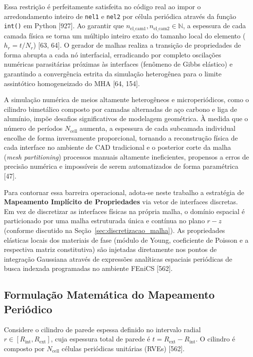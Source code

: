 Essa restrição é perfeitamente satisfeita no código real ao impor o arredondamento inteiro de \texttt{nel1} e \texttt{nel2} por célula periódica através da função \texttt{int()} em Python [927]. Ao garantir que $n_{\text{el\_cam1}}, n_{\text{el\_cam2}} \in \mathbb{N}$, a espessura de cada camada física se torna um múltiplo inteiro exato do tamanho local do elemento ($h_r = t / N_r$) [63, 64]. O gerador de malhas realiza a transição de propriedades de forma abrupta a cada nó interfacial, erradicando por completo oscilações numéricas parasitárias próximas às interfaces (fenômeno de Gibbs elástico) e garantindo a convergência estrita da simulação heterogênea para o limite assintótico homogeneizado do MHA [64, 154].

A simulação numérica de meios altamente heterogêneos e microperiódicos, como o cilindro bimetálico composto por camadas alternadas de aço carbono e liga de alumínio, impõe desafios significativos de modelagem geométrica. À medida que o número de períodos $N_{\text{cell}}$ aumenta, a espessura de cada subcamada individual encolhe de forma inversamente proporcional, tornando a reconstrução física de cada interface no ambiente de CAD tradicional e o posterior corte da malha (\textit{mesh partitioning}) processos manuais altamente ineficientes, propensos a erros de precisão numérica e impossíveis de serem automatizados de forma paramétrica [47].

Para contornar essa barreira operacional, adota-se neste trabalho a estratégia de \textbf{Mapeamento Implícito de Propriedades} via vetor de interfaces discretas. Em vez de discretizar as interfaces físicas na própria malha, o domínio espacial é particionado por uma malha estruturada única e contínua no plano $r-z$ (conforme discutido na Seção~\ref{sec:discretizacao_malha}). As propriedades elásticas locais dos materiais de fase (módulo de Young, coeficiente de Poisson e a respectiva matriz constitutiva) são injetadas diretamente nos pontos de integração Gaussiana através de expressões analíticas espaciais periódicas de busca indexada programadas no ambiente FEniCS [562].

\subsection{Formulação Matemática do Mapeamento Periódico}

Considere o cilindro de parede espessa definido no intervalo radial $r \in [R_{\text{int}}, R_{\text{ext}}]$, cuja espessura total de parede é $t = R_{\text{ext}} - R_{\text{int}}$. O cilindro é composto por $N_{\text{cell}}$ células periódicas unitárias (RVEs) [562].

